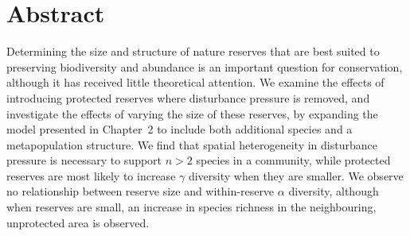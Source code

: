 \newpage
{}
\vspace*{\fill}
\section*{Abstract}
Determining the size and structure of nature reserves that are best suited to preserving biodiversity and abundance is an important question for conservation, although it has received little theoretical attention. We examine the effects of introducing protected reserves where disturbance pressure is removed, and investigate the effects of varying the size of these reserves, by expanding the model presented in Chapter~2 to include both additional species and a metapopulation structure. We find that spatial heterogeneity in disturbance pressure is necessary to support $n>2$ species in a community, while protected reserves are most likely to increase $\gamma$ diversity when they are smaller. We observe no relationship between reserve size and within-reserve $\alpha$ diversity, although when reserves are small, an increase in species richness in the neighbouring, unprotected area is observed.
\vspace*{\fill}
\newpage

